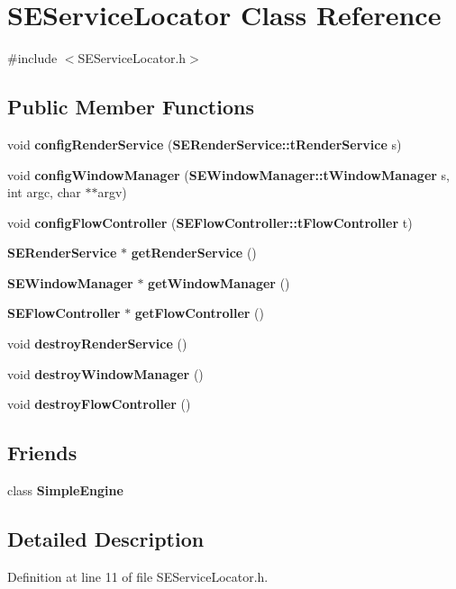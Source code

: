\section{S\+E\+Service\+Locator Class Reference}
\label{class_s_e_service_locator}


{\ttfamily \#include $<$S\+E\+Service\+Locator.\+h$>$}

\subsection*{Public Member Functions}
\begin{DoxyCompactItemize}
\item 
void {\bf config\+Render\+Service} ({\bf S\+E\+Render\+Service\+::t\+Render\+Service} s)
\item 
void {\bf config\+Window\+Manager} ({\bf S\+E\+Window\+Manager\+::t\+Window\+Manager} s, int argc, char $\ast$$\ast$argv)
\item 
void {\bf config\+Flow\+Controller} ({\bf S\+E\+Flow\+Controller\+::t\+Flow\+Controller} t)
\item 
{\bf S\+E\+Render\+Service} $\ast$ {\bf get\+Render\+Service} ()
\item 
{\bf S\+E\+Window\+Manager} $\ast$ {\bf get\+Window\+Manager} ()
\item 
{\bf S\+E\+Flow\+Controller} $\ast$ {\bf get\+Flow\+Controller} ()
\item 
void {\bf destroy\+Render\+Service} ()
\item 
void {\bf destroy\+Window\+Manager} ()
\item 
void {\bf destroy\+Flow\+Controller} ()
\end{DoxyCompactItemize}
\subsection*{Friends}
\begin{DoxyCompactItemize}
\item 
class {\bf Simple\+Engine}
\end{DoxyCompactItemize}


\subsection{Detailed Description}


Definition at line 11 of file S\+E\+Service\+Locator.\+h.



